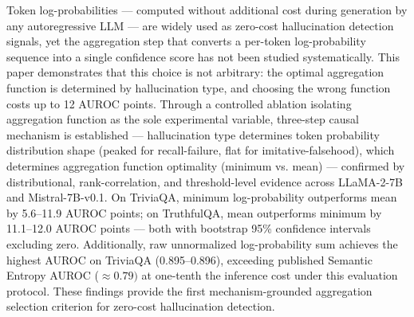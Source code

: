 
Token log-probabilities --- computed without additional cost during generation by any autoregressive LLM --- are widely used as zero-cost hallucination detection signals, yet the aggregation step that converts a per-token log-probability sequence into a single confidence score has not been studied systematically. This paper demonstrates that this choice is not arbitrary: the optimal aggregation function is determined by hallucination type, and choosing the wrong function costs up to 12 AUROC points. Through a controlled ablation isolating aggregation function as the sole experimental variable, three-step causal mechanism is established --- hallucination type determines token probability distribution shape (peaked for recall-failure, flat for imitative-falsehood), which determines aggregation function optimality (minimum vs. mean) --- confirmed by distributional, rank-correlation, and threshold-level evidence across LLaMA-2-7B and Mistral-7B-v0.1. On TriviaQA, minimum log-probability outperforms mean by 5.6--11.9 AUROC points; on TruthfulQA, mean outperforms minimum by 11.1--12.0 AUROC points --- both with bootstrap 95\% confidence intervals excluding zero. Additionally, raw unnormalized log-probability sum achieves the highest AUROC on TriviaQA (0.895--0.896), exceeding published Semantic Entropy AUROC ($\approx 0.79)$ at one-tenth the inference cost under this evaluation protocol. These findings provide the first mechanism-grounded aggregation selection criterion for zero-cost hallucination detection.

